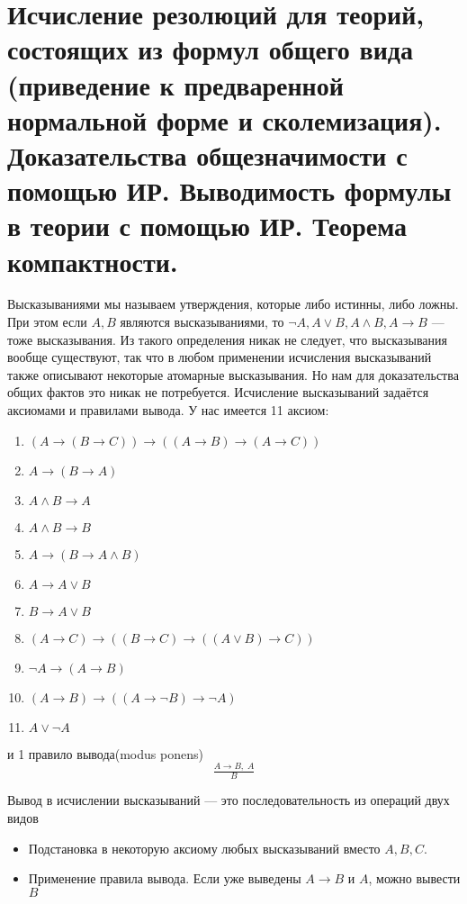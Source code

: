 \documentclass{article}
\begin{document}
\section{Исчисление резолюций для теорий, состоящих из формул общего вида (приведение к предваренной нормальной форме и сколемизация). Доказательства общезначимости с помощью ИР. Выводимость формулы в теории с помощью ИР. Теорема компактности.}
Высказываниями мы называем утверждения, которые либо истинны, либо ложны. При этом если $A, B$ являются высказываниями, то $\lnot A, A \lor B, A \land B, A \to B$ --- тоже высказывания. Из такого определения никак не следует, что высказывания вообще существуют, так что в любом применении исчисления высказываний также описывают некоторые атомарные высказывания. Но нам для доказательства общих фактов это никак не потребуется. Исчисление высказываний задаётся аксиомами и правилами вывода. У нас имеется 11 аксиом:
\begin{enumerate}
	\item $(A \to (B \to C)) \to ((A \to B) \to (A \to C))$
	\item $A \to (B \to A)$
	\item $A \land B \to A$
	\item $A \land B \to B$
	\item $A \to (B \to A \land B)$
	\item $A \to A \lor B$
	\item $B \to A \lor B$
	\item $(A \to C) \to ((B \to C) \to ((A \lor B) \to C))$
	\item $\lnot A \to (A \to B)$
	\item $(A \to B) \to ((A \to \lnot B) \to \lnot A)$
	\item $A \lor \lnot A$
\end{enumerate}
и 1 правило вывода(modus ponens)
\[\tfrac{A \to B, \; A}{B} \]

Вывод в исчислении высказываний --- это последовательность из операций двух видов
\begin{itemize}
	\item Подстановка в некоторую аксиому любых высказываний вместо $A, B, C$.
	\item Применение правила вывода. Если уже выведены $A\to B$ и $A$, можно вывести $B$
\end{itemize}
\end{document}
